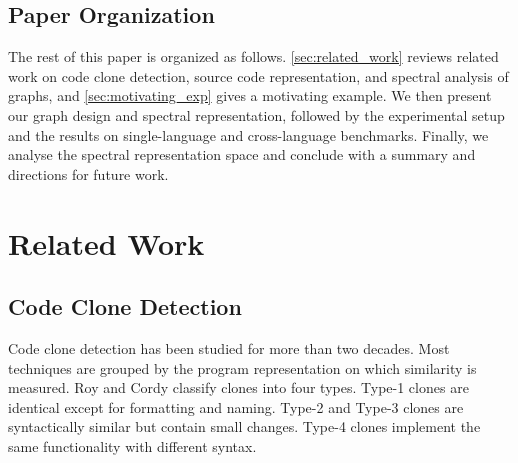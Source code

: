\documentclass[authoryear,final,5p,times,twocolumn]{elsarticle}
\theoremstyle{plain}
\begin{document}

\subsection{Paper Organization}
\label{subsec:outline}

The rest of this paper is organized as follows. \autoref{sec:related_work} reviews related work on code clone
detection, source code representation, and spectral analysis of graphs, and
\autoref{sec:motivating_exp} gives a motivating example. We then present our
graph design and spectral representation, followed by the experimental
setup and the results on single-language and cross-language benchmarks.
Finally, we analyse the spectral representation space and conclude with a
summary and directions for future work.


\section{Related Work}
\label{sec:related_work}


\subsection{Code Clone Detection}
\label{subsec:ccd}

Code clone detection has been studied for more than two decades. Most
techniques are grouped by the program representation on which similarity
is measured. Roy and Cordy \cite{roy2007survey} classify clones into four
types. Type-1 clones are identical except for formatting and naming.
Type-2 and Type-3 clones are syntactically similar but contain small
changes. Type-4 clones implement the same functionality with different
syntax.
\end{document}
